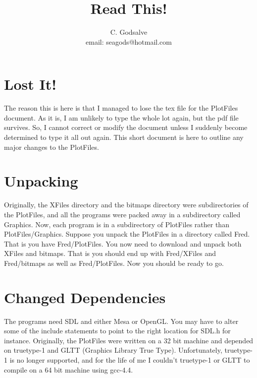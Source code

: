 \documentclass[12pt]{article}
\begin{document}

\thispagestyle{empty}


\title{Read This!}

\author{C. Godsalve \\
   email: seagods@hotmail.com}

\maketitle

\tableofcontents


\section{Lost It!}

The reason this is here is that I managed to lose the tex file for the PlotFiles document. As it is, I am unlikely to type the whole lot again, but the pdf file survives. So, I cannot correct or modify the document unless I suddenly become determined to type it all out again.
This short document is here to outline any major changes to the PlotFiles.

\section{Unpacking}

Originally, the XFiles directory and the bitmaps directory were subdirectories of the PlotFiles, and all the programs were packed away in a subdirectory called Graphics. Now, each program is in a subdirectory of PlotFiles rather than PlotFiles/Graphics. Suppose you unpack the PlotFiles in a directory called Fred.
That is you have Fred/PlotFiles. You now need to download and unpack both
XFiles and bitmaps. That is you should end up with Fred/XFiles and Fred/bitmaps as well as Fred/PlotFiles. Now you should be ready to go.

\section{Changed Dependencies}

The programs need SDL and either Mesa or OpenGL. You may have to alter some  of the include statements to point to the right location for SDL.h for instance. Originally, the PlotFiles were written on a 32 bit machine and depended on truetype-1
 and GLTT (Graphics Library True Type). Unfortunately, truetype-1 is no longer supported, and for the life of me I couldn't truetype-1 or GLTT to compile on a
64 bit machine  using gcc-4.4.
\end{document}
